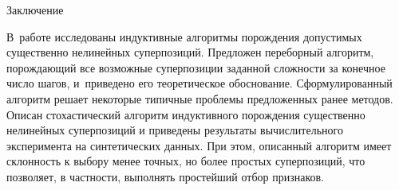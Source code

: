 \documentclass[12pt,a4paper]{article}
\makeatletter
\renewcommand{\section}{\@startsection {section}{1}
  \z@{2.7ex \@plus 1ex}{1.0ex}%
  {\normalfont}}
\makeatother
\begin{document}
\section{Заключение}

В~работе исследованы индуктивные алгоритмы порождения допустимых существенно
нелинейных суперпозиций. Предложен переборный алгоритм, порождающий все
возможные суперпозиции заданной сложности за конечное число шагов, и~приведено
его теоретическое обоснование.
Сформулированный алгоритм решает некоторые типичные проблемы предложенных ранее методов.
Описан стохастический алгоритм индуктивного порождения существенно нелинейных
суперпозиций и приведены результаты вычислительного эксперимента на синтетических
данных. При этом, описанный алгоритм имеет склонность к выбору менее точных,
но более простых суперпозиций, что позволяет, в частности, выполнять простейший
отбор признаков.

\FloatBarrier


%
%

\end{document}

